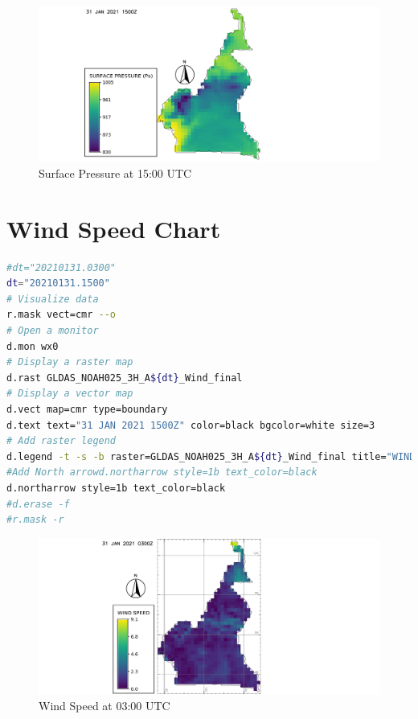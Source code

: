 \begin{figure}[H]
\begin{center}
\includegraphics[scale=0.6]{sp15.png} %
\end{center}
\caption{Surface Pressure  at 15:00 UTC}
\label{Surface Pressure  at 15:00 UTC}%
\end{figure}


\section{Wind Speed Chart}
\begin{lstlisting}[language=Bash]
#dt="20210131.0300"
dt="20210131.1500"
# Visualize data
r.mask vect=cmr --o
# Open a monitor
d.mon wx0
# Display a raster map
d.rast GLDAS_NOAH025_3H_A${dt}_Wind_final
# Display a vector map
d.vect map=cmr type=boundary
d.text text="31 JAN 2021 1500Z" color=black bgcolor=white size=3
# Add raster legend
d.legend -t -s -b raster=GLDAS_NOAH025_3H_A${dt}_Wind_final title="WIND SPEED m/s" title_fontsize=20 font=sans fontsize=18
#Add North arrowd.northarrow style=1b text_color=black
d.northarrow style=1b text_color=black
#d.erase -f
#r.mask -r

\end{lstlisting}

\begin{figure}[H]
\begin{center}
\includegraphics[scale=0.6]{ws03.png} %
\end{center}
\caption{Wind Speed at 03:00 UTC}
\label{Surface Pressure  at 03:00 UTC}%
\end{figure}

